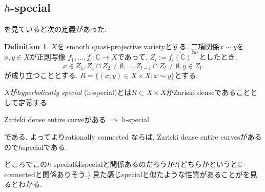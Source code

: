 \documentclass[dvipdfmx,a4paper,11pt]{article} %
\theoremstyle{definition}
\newtheorem{defn}[thm]{Definition}
\theoremstyle{remark}
\numberwithin{equation}{section}
\newcommand{\C}{\mathbb{C}}
\begin{document}
\subsection{$h$-special}
\cite{CDY22}を見ていると次の定義があった. 


\begin{defn}\cite[Definition 1.11 (h-special)]{CDY22}
$X$を smooth quasi-projective varietyとする. 
二項関係$x \sim y$を
$x, y \in X$が正則写像 \(f_1, \ldots, f_l : \mathbb{C} \to X\)であって, 
$Z_i :=\overline{f_i(\mathbb{C})}^{zar}$としたとき, 
\[
x \in Z_1, Z_1 \cap Z_2 \neq \emptyset, \ldots, Z_{l-1} \cap Z_l \neq \emptyset, y \in Z_l.
\]
が成り立つこととする. 
$R = \{(x,y) \in X \times X; x \sim y\}$とする. 

$X$が\emph{hyperbolically special} (h-special)とは$R \subset X \times X$がZariski denseであることとして定義する. 
\end{defn}
\begin{center}
Zariski dense entire curveがある
$\Rightarrow$
h-special
\end{center}
である. よって\cite{CW23}よりrationally connected ならば, Zariski dense entire curvesがあるので$h$specialである. 

ところでこの$h$-specialはspecialと関係あるのだろうか?(どちらかというと$\C$-connectedと関係ありそう.)
見た感じspecialと似たような性質があることが\cite[Section 10]{CDY22}を見るとわかる. 



\end{document}
